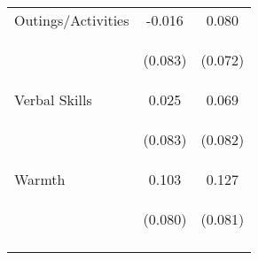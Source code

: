 \begin{tabular}{lcc}
\noalign{\smallskip}Outings/Activities & -0.016 & 0.080\\
 & \begin{footnotesize}(0.083)\end{footnotesize} & \begin{footnotesize}(0.072)\end{footnotesize}\\
\noalign{\smallskip}Verbal Skills & 0.025 & 0.069\\
 & \begin{footnotesize}(0.083)\end{footnotesize} & \begin{footnotesize}(0.082)\end{footnotesize}\\
\noalign{\smallskip}Warmth & 0.103 & 0.127\\
 & \begin{footnotesize}(0.080)\end{footnotesize} & \begin{footnotesize}(0.081)\end{footnotesize}\\
\noalign{\smallskip}\hline\end{tabular}\\
